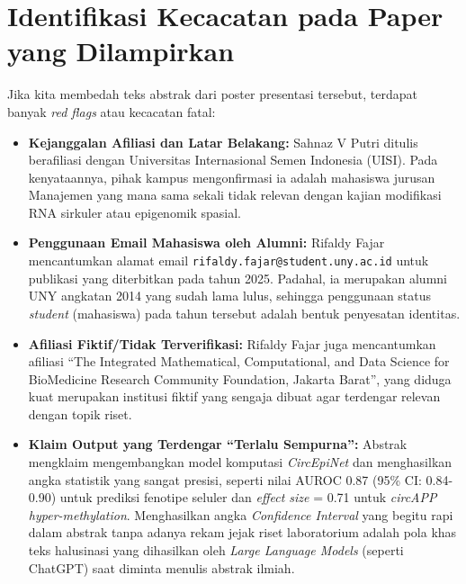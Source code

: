 \documentclass[12pt, a4paper]{article}
\begin{document}
\section{Identifikasi Kecacatan pada Paper yang Dilampirkan}
Jika kita membedah teks abstrak dari poster presentasi tersebut, terdapat banyak \textit{red flags} atau kecacatan fatal:
\begin{itemize}
  \item \textbf{Kejanggalan Afiliasi dan Latar Belakang:} Sahnaz V Putri ditulis berafiliasi dengan Universitas Internasional Semen Indonesia (UISI). Pada kenyataannya, pihak kampus mengonfirmasi ia adalah mahasiswa jurusan Manajemen yang mana sama sekali tidak relevan dengan kajian modifikasi RNA sirkuler atau epigenomik spasial.
  \item \textbf{Penggunaan Email Mahasiswa oleh Alumni:} Rifaldy Fajar mencantumkan alamat email \texttt{rifaldy.fajar@student.uny.ac.id} untuk publikasi yang diterbitkan pada tahun 2025. Padahal, ia merupakan alumni UNY angkatan 2014 yang sudah lama lulus, sehingga penggunaan status \textit{student} (mahasiswa) pada tahun tersebut adalah bentuk penyesatan identitas.
  \item \textbf{Afiliasi Fiktif/Tidak Terverifikasi:} Rifaldy Fajar juga mencantumkan afiliasi ``The Integrated Mathematical, Computational, and Data Science for BioMedicine Research Community Foundation, Jakarta Barat'', yang diduga kuat merupakan institusi fiktif yang sengaja dibuat agar terdengar relevan dengan topik riset.
  \item \textbf{Klaim Output yang Terdengar ``Terlalu Sempurna'':} Abstrak mengklaim mengembangkan model komputasi \textit{CircEpiNet} dan menghasilkan angka statistik yang sangat presisi, seperti nilai AUROC 0.87 (95\% CI: 0.84-0.90) untuk prediksi fenotipe seluler dan \textit{effect size} = 0.71 untuk \textit{circAPP hyper-methylation}. Menghasilkan angka \textit{Confidence Interval} yang begitu rapi dalam abstrak tanpa adanya rekam jejak riset laboratorium adalah pola khas teks halusinasi yang dihasilkan oleh \textit{Large Language Models} (seperti ChatGPT) saat diminta menulis abstrak ilmiah.
\end{itemize}
\end{document}
